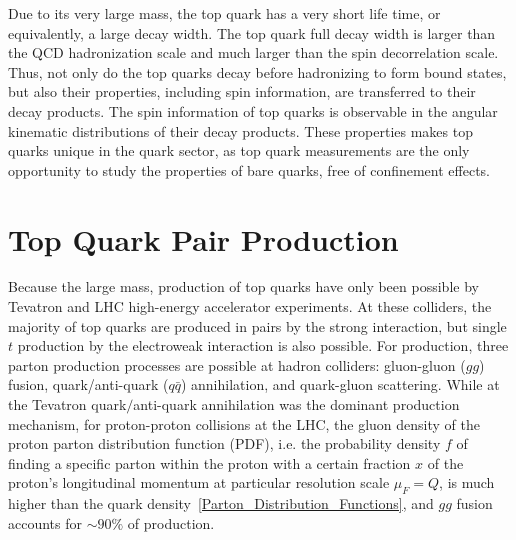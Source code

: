 Due to its very large mass, the top quark has a very short life time, or equivalently, a large decay width.
The top quark full decay width is larger than the QCD hadronization scale and much larger than the spin decorrelation scale.
Thus, not only do the top quarks decay before hadronizing to form bound states, but also their properties, including spin information, are transferred to their decay products.
The spin information of top quarks is observable in the angular kinematic distributions of their decay products.
These properties makes top quarks unique in the quark sector, as top quark measurements are the only opportunity to study the properties of bare quarks, free of confinement effects.

\section{Top Quark Pair Production}
Because the large mass, production of top quarks have only been possible by Tevatron and LHC high-energy accelerator experiments.
At these colliders, the majority of top quarks are produced in \ttbar pairs by the strong interaction, but single $t$ production by the electroweak interaction is also possible.
For \ttbar production, three parton production processes are possible at hadron colliders: gluon-gluon ($gg$) fusion, quark/anti-quark ($q\bar{q}$) annihilation, and quark-gluon scattering.
While at the Tevatron quark$\slash$anti-quark annihilation was the dominant production mechanism, for \beamenergy proton-proton collisions at the LHC, the gluon density of the proton parton distribution function (PDF), i.e. the probability density $f$ of finding a specific parton within the proton with a certain fraction $x$ of the proton's longitudinal momentum at particular resolution scale $\mu_F = Q$, is much higher than the quark density~\ref{Parton_Distribution_Functions}, and $gg$ fusion accounts for $\sim 90 \%$ of \ttbar production.
